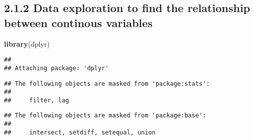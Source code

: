 \documentclass[]{article}
\newenvironment{Shaded}{\begin{snugshade}}{\end{snugshade}}
\newcommand{\CommentTok}[1]{\textcolor[rgb]{0.56,0.35,0.01}{\textit{#1}}}
\newcommand{\ControlFlowTok}[1]{\textcolor[rgb]{0.13,0.29,0.53}{\textbf{#1}}}
\newcommand{\DataTypeTok}[1]{\textcolor[rgb]{0.13,0.29,0.53}{#1}}
\newcommand{\DecValTok}[1]{\textcolor[rgb]{0.00,0.00,0.81}{#1}}
\newcommand{\KeywordTok}[1]{\textcolor[rgb]{0.13,0.29,0.53}{\textbf{#1}}}
\newcommand{\NormalTok}[1]{#1}
\newcommand{\OperatorTok}[1]{\textcolor[rgb]{0.81,0.36,0.00}{\textbf{#1}}}
\newcommand{\OtherTok}[1]{\textcolor[rgb]{0.56,0.35,0.01}{#1}}
\newcommand{\StringTok}[1]{\textcolor[rgb]{0.31,0.60,0.02}{#1}}
\begin{document}
\hypertarget{data-exploration-to-find-the-relationship-between-continous-variables}{%
\subsection{2.1.2 Data exploration to find the relationship between
continous
variables}\label{data-exploration-to-find-the-relationship-between-continous-variables}}

\begin{Shaded}
\begin{Highlighting}[]
\KeywordTok{library}\NormalTok{(dplyr)}
\end{Highlighting}
\end{Shaded}

\begin{verbatim}
## 
## Attaching package: 'dplyr'
\end{verbatim}

\begin{verbatim}
## The following objects are masked from 'package:stats':
## 
##     filter, lag
\end{verbatim}

\begin{verbatim}
## The following objects are masked from 'package:base':
## 
##     intersect, setdiff, setequal, union
\end{verbatim}

\begin{Shaded}
\end{Shaded}
\end{document}

